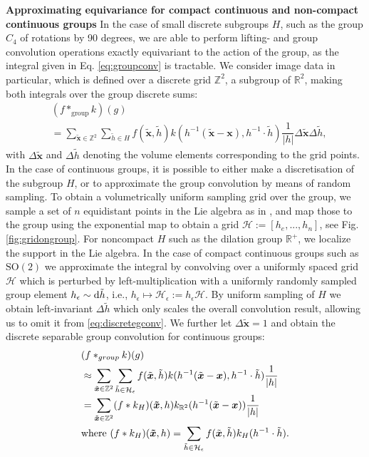 \documentclass[nohyperref]{article}
\theoremstyle{plain}
\theoremstyle{definition}
\theoremstyle{remark}
\newcommand{\R}{\mathbb{R}}
\begin{document}
\textbf{Approximating equivariance for compact continuous and non-compact continuous groups} In the case of small discrete subgroups $H$, such as the group $C_4$ of rotations by 90 degrees, we are able to perform lifting- and group convolution operations exactly equivariant to the action of the group, as the integral given in Eq. \ref{eq:groupconv} is tractable. We consider image data in particular, which is defined over a discrete grid $\mathbb{Z}^2$, a subgroup of $\R^2$, making both integrals over the group discrete sums:
\begin{align}
    &(f *_{\mathrm{group}} k)(g) \nonumber \\ &= \sum_{\tilde{\boldsymbol{x}} \in \mathbb{Z}^2}\sum_{\tilde{h} \in H} f(\tilde{\boldsymbol{x}}, \tilde{h})k(h^{-1}(\tilde{\boldsymbol{x}}-\boldsymbol{x}), h^{-1}\cdot \tilde{h})\dfrac{1}{|h|} \Delta\tilde{\boldsymbol{x}}\Delta\tilde{h},
    \label{eq:discretegconv}
\end{align}
with $\Delta \tilde{\boldsymbol{x}}$ and $\Delta \tilde{{h}}$ denoting the volume elements corresponding to the grid points. In the case of continuous groups, it is possible to either make a discretisation of the subgroup $H$, or to approximate the group convolution by means of random sampling. To obtain a volumetrically uniform sampling grid over the group, we sample a set of $n$ equidistant points in the Lie algebra as in \citet{bekkers2019b}, and map those to the group using the exponential map to obtain a grid $\mathcal{H}:=[h_e, ..., h_n]$, see Fig. \ref{fig:gridongroup}. For noncompact $H$ such as the dilation group $\R^+$, we localize the support in the Lie algebra. In the case of compact continuous groups such as $\mathrm{SO(2)}$ we approximate the integral by convolving over a uniformly spaced grid $\mathcal{H}$ which is perturbed by left-multiplication with a uniformly randomly sampled group element $h_{\epsilon} \sim {\rm d}\tilde{h}$, i.e.,  $h_{\epsilon} \mapsto \mathcal{H}_{\epsilon}:=h_{\epsilon} \mathcal{H}$. By uniform sampling of $H$ we obtain left-invariant $\Delta \tilde{h}$ which only scales the overall convolution result, allowing us to omit it from \ref{eq:discretegconv}. We further let $\Delta \tilde{\boldsymbol{x}}=1$ and obtain the discrete separable group convolution for continuous groups:
\begin{align}
&(f *_{group} k)(g) \\ &\approx \sum_{\tilde{\boldsymbol{x}} \in \mathbb{Z}^2}\sum_{\tilde{h} \in \mathcal{H}_{\epsilon}} f(\tilde{\boldsymbol{x}}, \tilde{h})k({h^{-1}}(\tilde{\boldsymbol{x}}-\boldsymbol{x}), h^{-1}\cdot \tilde{h})\dfrac{1}{|h|}  \nonumber\\[-1 \jot]
    &= \sum_{\tilde{\boldsymbol{x}} \in \mathbb{Z}^2} (f * k_H)(\boldsymbol{\tilde{x}}, h) k_{\R^2}({h^{-1}}(\tilde{\boldsymbol{x}}-\boldsymbol{x}))\frac{1}{|h|} \label{eq:discretefinalsepgconv} \\
    &\text{where } (f * k_H)(\boldsymbol{\tilde{x}}, h)=\sum_{\tilde{h} \in \mathcal{H}_{\epsilon}} f(\tilde{\boldsymbol{x}}, \tilde{h})k_H (h^{-1}\cdot \tilde{h}) \nonumber. 
\end{align}
\end{document}
